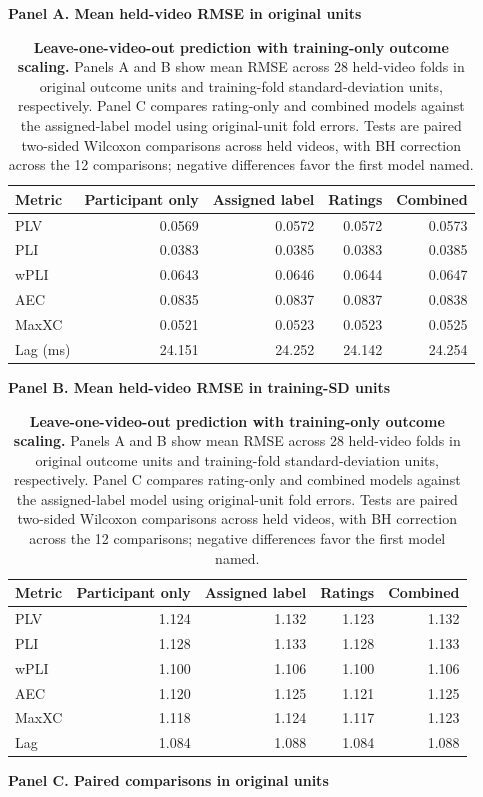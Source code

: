 \begin{table}[!htbp]
\centering
\caption{\textbf{Leave-one-video-out prediction with training-only outcome scaling.} Panels A and B show mean RMSE across 28 held-video folds in original outcome units and training-fold standard-deviation units, respectively. Panel C compares rating-only and combined models against the assigned-label model using original-unit fold errors. Tests are paired two-sided Wilcoxon comparisons across held videos, with BH correction across the 12 comparisons; negative differences favor the first model named.}
\label{tab:s9-loov}
\scriptsize
\textbf{Panel A. Mean held-video RMSE in original units}\\[3pt]
\begin{tabular}{lrrrr}
\toprule
Metric & Participant only & Assigned label & Ratings & Combined \\
\midrule
PLV & 0.0569 & 0.0572 & 0.0572 & 0.0573 \\
PLI & 0.0383 & 0.0385 & 0.0383 & 0.0385 \\
wPLI & 0.0643 & 0.0646 & 0.0644 & 0.0647 \\
AEC & 0.0835 & 0.0837 & 0.0837 & 0.0838 \\
MaxXC & 0.0521 & 0.0523 & 0.0523 & 0.0525 \\
Lag (ms) & 24.151 & 24.252 & 24.142 & 24.254 \\
\bottomrule
\end{tabular}\par
\vspace{7pt}
\textbf{Panel B. Mean held-video RMSE in training-SD units}\\[3pt]
\begin{tabular}{lrrrr}
\toprule
Metric & Participant only & Assigned label & Ratings & Combined \\
\midrule
PLV & 1.124 & 1.132 & 1.123 & 1.132 \\
PLI & 1.128 & 1.133 & 1.128 & 1.133 \\
wPLI & 1.100 & 1.106 & 1.100 & 1.106 \\
AEC & 1.120 & 1.125 & 1.121 & 1.125 \\
MaxXC & 1.118 & 1.124 & 1.117 & 1.123 \\
Lag & 1.084 & 1.088 & 1.084 & 1.088 \\
\bottomrule
\end{tabular}\par
\vspace{7pt}
\textbf{Panel C. Paired comparisons in original units}\\[3pt]

\end{table}
